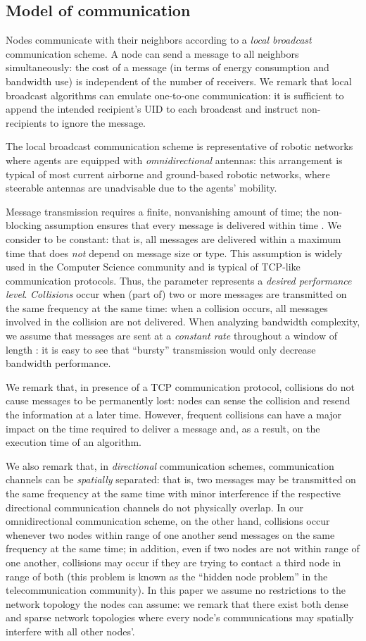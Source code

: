 \documentclass[letterpaper,10pt,conference]{ieeeconf}
\begin{document}
\subsection{Model of communication}
Nodes communicate with their neighbors according to a \emph{local broadcast} communication scheme. A node can send a message to all neighbors simultaneously: the cost of a message (in terms of energy consumption and bandwidth use)  is independent of the number of receivers. 
We remark that local broadcast algorithms can emulate one-to-one communication: it is sufficient to append the intended recipient's UID to each broadcast and instruct non-recipients to ignore the message. 

The local broadcast communication scheme is representative of robotic networks where agents are equipped with \emph{omnidirectional} antennas: this arrangement is typical of most current airborne and ground-based robotic networks, where steerable antennas are unadvisable due to the agents' mobility. 

Message transmission requires a finite, nonvanishing amount of time; the non-blocking assumption ensures that every message is delivered within time .
We consider  to be constant: that is, all messages are delivered within a maximum time that does \emph{not} depend on message size or type. This assumption is widely used in the Computer Science community \cite{NL:96} and is typical of TCP-like communication protocols.
Thus, the parameter  represents a \emph{desired performance level}.
\emph{Collisions} occur when (part of) two or more messages are transmitted on the same frequency at the same time: when a collision occurs, all messages involved in the collision are not delivered. When analyzing bandwidth complexity, we assume that messages are sent at a \emph{constant rate} throughout a window of length : it is easy to see that ``bursty'' transmission would only decrease bandwidth performance.

We remark that, in presence of a TCP communication protocol, collisions do not cause messages to be permanently lost: nodes can sense the collision and resend the information at a later time. However, frequent collisions can have a major impact on the time required to deliver a message and, as a result, on the execution time of an algorithm.

We also remark that, in \emph{directional} communication schemes, communication channels can be \emph{spatially} separated: that is, two messages may be transmitted on the same frequency at the same time with minor interference if the respective directional communication channels do not physically overlap. In our omnidirectional communication scheme, on the other hand, collisions occur whenever two nodes within range of one another send messages on the same frequency at the same time; in addition, even if two nodes are not within range of one another, collisions may occur if they are trying to contact a third node in range of both (this problem is known as the ``hidden node problem'' in the telecommunication community). In this paper we assume no restrictions to the network topology the nodes can assume: we remark that there exist both dense and sparse network topologies where every node's communications may spatially interfere with all other nodes'.
\end{document}
